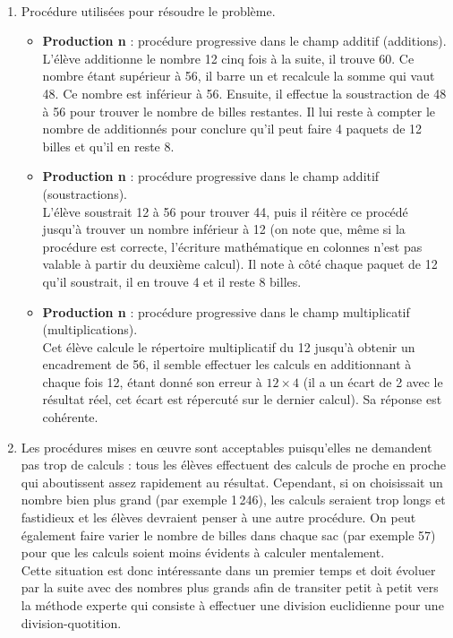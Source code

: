 \ \\ [-5mm]
\begin{enumerate}
   \item Procédure utilisées pour résoudre le problème.
   \begin{itemize}
      \item {\bf Production n} : procédure progressive dans le champ additif (additions). \\
      L'élève additionne le nombre 12 cinq fois à la suite, il trouve 60. Ce nombre étant supérieur à 56, il barre un  \fg{} et recalcule la somme qui vaut 48. Ce nombre est inférieur à 56. Ensuite, il effectue la soustraction de 48 à 56 pour trouver le nombre de billes restantes. Il lui reste à compter le nombre de  \fg{} additionnés pour conclure qu'il peut faire 4 paquets de 12 billes et qu'il en reste 8.
      \item {\bf Production n} : procédure progressive dans le champ additif (soustractions). \\
      L'élève soustrait 12 à 56 pour trouver 44, puis il réitère ce procédé jusqu'à trouver un nombre inférieur à 12 (on note que, même si la procédure est correcte, l'écriture mathématique en colonnes n'est pas valable à partir du deuxième calcul). Il note à côté chaque paquet de 12 qu'il soustrait, il en trouve 4 et il reste 8 billes.
      \item {\bf Production n} : procédure progressive dans le champ multiplicatif (multiplications). \\
      Cet élève calcule le répertoire multiplicatif du 12 jusqu'à obtenir un encadrement de 56, il semble effectuer les calculs en additionnant à chaque fois 12, étant donné son erreur à $12\times4$ (il a un écart de 2 avec le résultat réel, cet écart est répercuté sur le dernier calcul). Sa réponse est cohérente.
   \end{itemize}
   \item Les procédures mises en \oe uvre sont acceptables puisqu'elles ne demandent pas trop de calculs : tous les élèves effectuent des calculs de proche en proche qui aboutissent assez rapidement au résultat. Cependant, si on choisissait un nombre bien plus grand (par exemple 1\,246), les calculs seraient trop longs et fastidieux et les élèves devraient penser à une autre procédure. On peut également faire varier le nombre de billes dans chaque sac (par exemple 57) pour que les calculs soient moins évidents à calculer mentalement. \\
   Cette situation est donc intéressante dans un premier temps et doit évoluer par la suite avec des nombres plus grands afin de transiter petit à petit vers la méthode experte qui consiste à effectuer une division euclidienne pour une division-quotition.

\end{enumerate}
